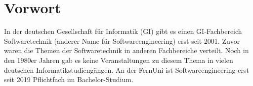 \cleardoublepage
\chapter*{Vorwort}
\label{sec:Kap-0.1}

In der deutschen Gesellschaft für Informatik (GI) gibt es einen GI-Fachbereich Softwaretechnik (anderer Name für Softwareengineering) erst seit 2001. Zuvor waren die Themen der Softwaretechnik in anderen Fachbereiche verteilt. Noch in den 1980er Jahren gab es keine Veranstaltungen zu diesem Thema in vielen deutschen Informatikstudiengängen. An der FernUni ist Softwareengineering erst seit 2019 Pflichtfach im Bachelor-Studium.